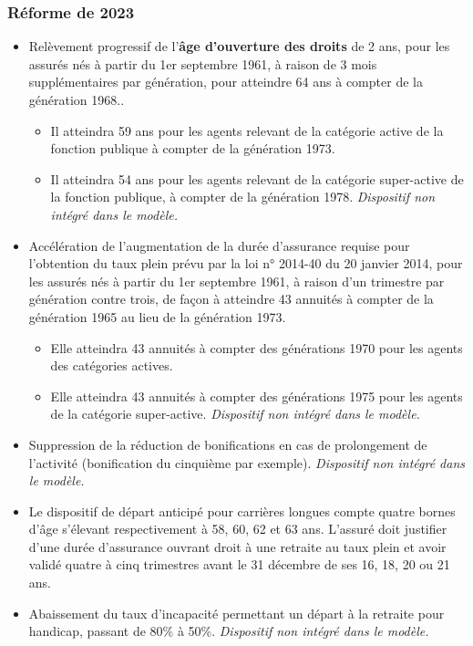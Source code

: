 \subsubsection{Réforme de 2023}
\begin{itemize}
	\item Relèvement progressif de l'\textbf{âge d'ouverture des droits} de 2 ans, pour les assurés nés à partir du 1er septembre 1961, à raison de 3 mois supplémentaires par génération, pour atteindre 64 ans à compter de la génération 1968..
	 \begin{itemize}
		\item Il atteindra 59 ans pour les agents relevant de la catégorie active de la fonction publique à compter de la génération 1973.
		\item Il atteindra 54 ans pour les agents relevant de la catégorie super-active de la fonction publique, à compter de la génération 1978. \textit{Dispositif non intégré dans le modèle.}
	 \end{itemize}
	 \item Accélération de l'augmentation de la durée d'assurance requise pour l'obtention du taux plein prévu par la loi n° 2014-40 du 20 janvier 2014, pour les assurés nés à partir du 1er septembre 1961, à raison d'un trimestre par génération contre trois, de façon à atteindre 43 annuités à compter de la génération 1965 au lieu de la génération 1973.
	 \begin{itemize}
		\item Elle atteindra 43 annuités à compter des générations 1970 pour les agents des catégories actives.
		\item Elle atteindra 43 annuités à compter des générations 1975 pour les agents de la catégorie super-active. \textit{Dispositif non intégré dans le modèle.}
	 \end{itemize}
	\item Suppression de la réduction de bonifications en cas de prolongement de l'activité (bonification du cinquième par exemple). \textit{Dispositif non intégré dans le modèle.}
	\item Le dispositif de départ anticipé pour carrières longues compte quatre bornes d'âge s'élevant respectivement à 58, 60, 62 et 63 ans. L'assuré doit justifier d'une durée d'assurance ouvrant droit à une retraite au taux plein et avoir validé quatre à cinq trimestres avant le 31 décembre de ses 16, 18, 20 ou 21 ans.
	\item Abaissement du taux d'incapacité permettant un départ à la retraite pour handicap, passant de 80\% à 50\%. \textit{Dispositif non intégré dans le modèle.}

\end{itemize}
